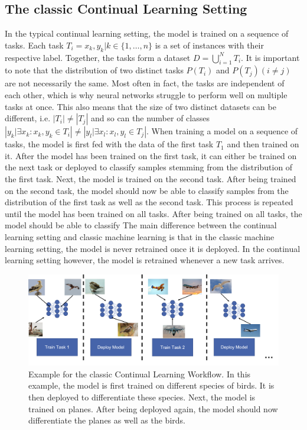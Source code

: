 \subsection{The classic Continual Learning Setting}
\label{sec:Methodology:CLSetting}
In the typical continual learning setting, the model is trained on a sequence of tasks. Each task $T_i = {x_k,y_k | k \in \{1,\ldots,n\}}$ is a set of instances 
with their respective label. Together, the tasks form a dataset $D = \bigcup\limits_{i=1}^{N} T_i$. It is important to note that
the distribution of two distinct tasks $P(T_i)$  and $P(T_j) (i \neq j)$ are not necessarily the same. Most often in fact, the tasks are independent of each
other, which is why neural networks struggle to perform well on multiple tasks at once. This also means that the size of two distinct datasets can be
different, i.e. $|T_i| \neq |T_j|$ and so can the number of classes $|{y_k | \exists x_k: x_k,y_k \in T_i}| \neq |{y_l | \exists x_l: x_l,y_l \in T_j}|$.
When training a model on a sequence of tasks, the model is first fed with the data of the first task $T_1$ and then trained on it. After the model has been trained
on the first task, it can either be trained on the next task or deployed to classify samples stemming from the distribution of the first task. Next, the model is
trained on the second task. After being trained on the second task, the model should now be able to classify samples from the distribution of the first task as well
as the second task. This process is repeated until the model has been trained on all tasks. After being trained on all tasks, the model should be able to classify
The main difference between the continual learning setting and classic machine learning is that in the classic machine learning setting, the model is never retrained
once it is deployed. In the continual learning setting however, the model is retrained whenever a new task arrives.

\begin{figure}[ht]
    \centering
    \includegraphics[width=.9\linewidth]{images/CL_workflow.png}
    \caption[Continual Learning Workflow]{Example for the classic Continual Learning Workflow. In this example, the model is first trained on different species of
    birds. It is then deployed to differentiate these species. Next, the model is trained on planes. After being deployed again, the model should now differentiate
    the planes as well as the birds.}
    \label{fig:CLWorkflow}
  \end{figure}

